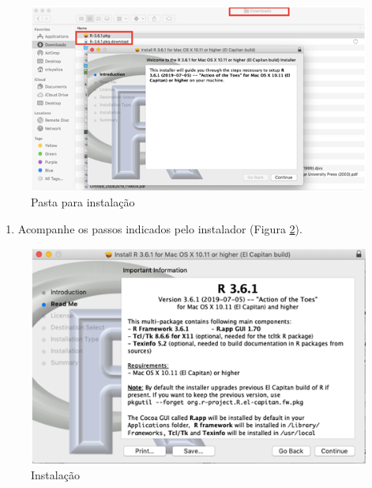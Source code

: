 \documentclass[
]{book}
\providecommand{\tightlist}{%
  \setlength{\itemsep}{0pt}\setlength{\parskip}{0pt}}
\begin{document}
\begin{figure}
\includegraphics[width=1\linewidth]{figures/mac_R_3} \caption{\label{fig:mac3} Pasta para instalação}\label{fig:mac3}
\end{figure}

\begin{enumerate}
\def\labelenumi{\arabic{enumi})}
\setcounter{enumi}{3}
\tightlist
\item
  Acompanhe os passos indicados pelo instalador (Figura \ref{fig:mac4}).
\end{enumerate}

\begin{figure}
\includegraphics[width=1\linewidth]{figures/mac_R_4} \caption{\label{fig:mac4} Instalação}\label{fig:mac4}
\end{figure}
\end{document}
